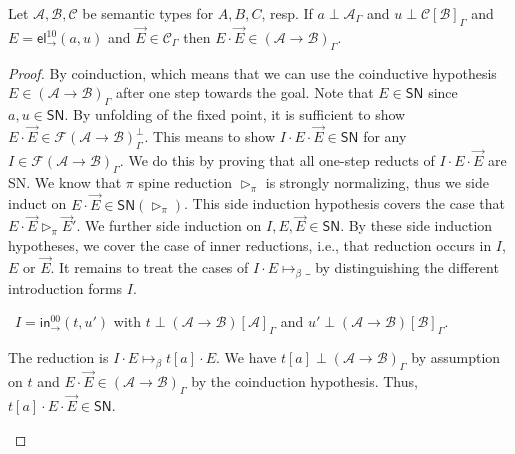 \documentclass[a4paper,USenglish,cleveref, autoref, thm-restate]{lipics-v2019}
\newenvironment{caselist}{%
  \begin{list}{{\it Case}}{%
  }%
}{\end{list}%
}
\newcommand{\nextcase}{\item~}
\newcommand{\tin}{\ensuremath{\mathsf{in}}}
\newcommand{\inn}[2]{\ensuremath{\tin_{#1}^{#2}}}
\newcommand{\tel}{\mathsf{el}}
\newcommand{\el}[2]{\ensuremath{\tel_{#1}^{#2}}}
\newcommand{\contract}[1][]{\mapsto_{#1}}
\newcommand{\whd}[1][]{\rhd_{#1}}
\newcommand{\A}{\mathcal{A}}
\newcommand{\B}{\mathcal{B}}
\newcommand{\C}{\mathcal{C}}
\newcommand{\F}{\mathcal{F}}
\newcommand{\SN}{\mathsf{SN}}
\begin{document}
\begin{lemma}
  \label{lem:appprev}
  Let $\A,\B,\C$ be semantic types for $A,B,C$, resp.  If
  $a \perp \A_\Gamma$ and $u \perp \C[\B]_\Gamma$ and
  $E = \el\to{10}(a,u)$ and $\vec E \in \C_\Gamma$ then
  $E \cdot \vec E \in (\A \to \B)_\Gamma$.
\end{lemma}
\begin{proof}
  By coinduction, which means that we can use the coinductive
  hypothesis $E \in (\A \to \B)_\Gamma$ after one step towards the
  goal.  Note that $E \in \SN$ since $a,u \in \SN$.  By unfolding of
  the fixed point, it is sufficient to show
  $E \cdot \vec E \in \F(\A \to \B)^\perp_\Gamma$.  This means to show
  $I \cdot E \cdot \vec E \in \SN$ for any
  $I \in \F(\A \to \B)_\Gamma$.
  We do this by proving that all one-step reducts of $I \cdot E \cdot
  \vec E$ are SN.
  We know that $\pi$ spine reduction $\whd[\pi]$ is strongly
  normalizing, thus we side induct on
  $E \cdot \vec E \in \SN(\whd[\pi])$. This side induction hypothesis
  covers the case that $E \cdot \vec E \whd[\pi] \vec E'$.
  We further side induction on $I,E,\vec E \in \SN$.  By these side
  induction hypotheses, we cover the case of inner reductions, i.e., that reduction occurs in
  $I$, $E$ or $\vec E$.
  It remains to treat the cases of $I \cdot E \contract[\beta] \_$
  by distinguishing the different introduction forms $I$.
  \begin{caselist}

    \nextcase $I = \inn\to{00}(t,u')$ with
    $t \perp (\A \to \B)[\A]_\Gamma$ and
    $u' \perp (\A \to \B)[\B]_\Gamma$.



    The reduction is $I \cdot E \contract[\beta] t[a] \cdot E$.  We have
    $t[a] \perp (\A \to \B)_\Gamma$ by assumption on $t$ and
    $E \cdot \vec E \in (\A \to \B)_\Gamma$ by the coinduction hypothesis.
    Thus, $t[a] \cdot E \cdot \vec E \in \SN$.


\end{caselist}
\end{proof}
\end{document}
